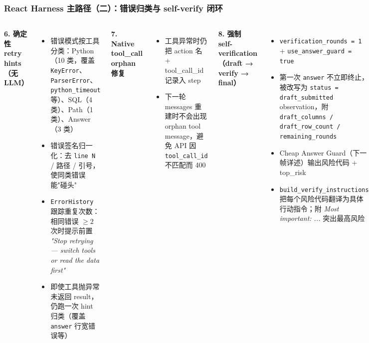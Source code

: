 \documentclass[11pt, aspectratio=169]{beamer}
\begin{document}
\begin{frame}[t]
\frametitle{React Harness 主路径（二）：错误归类与 self-verify 闭环}

\vspace{-0.3em}
\footnotesize
\begin{columns}[T,onlytextwidth]


\textbf{6. 确定性 retry hints（无 LLM）}
\begin{itemize}
    \setlength\itemsep{0.05em}
    \item 错误模式按工具分类：Python（10 类，覆盖 \texttt{KeyError}、\texttt{ParserError}、\texttt{python\_timeout} 等）、SQL（4 类）、Path（1 类）、Answer（3 类）
    \item 错误签名归一化：去 \texttt{line N} / 路径 / 引号，使同类错误能"碰头"
    \item \texttt{ErrorHistory} 跟踪重复次数：相同错误 $\geq 2$ 次时提示前置 \emph{"Stop retrying — switch tools or read the data first"}
    \item 即使工具抛异常未返回 result，仍跑一次 hint 归类（覆盖 \texttt{answer} 行宽错误等）
\end{itemize}

\vspace{0.3em}

\textbf{7. Native tool\_call orphan 修复}
\begin{itemize}
    \setlength\itemsep{0.05em}
    \item 工具异常时仍把 action 名 + tool\_call\_id 记录入 step
    \item 下一轮 messages 重建时不会出现 orphan tool message，避免 API 因 \texttt{tool\_call\_id} 不匹配而 400
\end{itemize}


\textbf{8. 强制 self-verification（draft → verify → final）}
\begin{itemize}
    \setlength\itemsep{0.05em}
    \item \texttt{verification\_rounds = 1} + \texttt{use\_answer\_guard = true}
    \item 第一次 \texttt{answer} 不立即终止，被改写为 \texttt{status = draft\_submitted} observation，附 \texttt{draft\_columns / draft\_row\_count / remaining\_rounds}
    \item \alert{Cheap Answer Guard}（下一帧详述）输出风险代码 + top\_risk
    \item \texttt{build\_verify\_instructions} 把每个风险代码翻译为具体行动指令；附 \emph{Most important: ...} 突出最高风险
\end{itemize}


\end{columns}
\end{frame}
\end{document}
